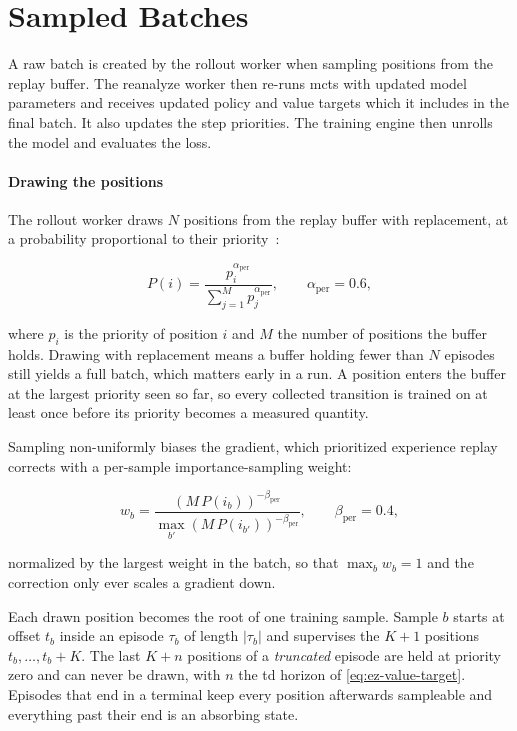 \section{Sampled Batches}\label{sec:app-loss-batch}

A raw batch is created by the rollout worker when sampling positions from the replay buffer.
The reanalyze worker then re-runs \gls{mcts} with updated model parameters and receives
updated policy and value targets which it includes in the final batch.
It also updates the step priorities.
The training engine then unrolls the model and evaluates the loss.

\paragraph{Drawing the positions}
The rollout worker draws $N$ positions from the replay buffer with replacement, at a probability
proportional to their priority~\cite{schaul_prioritized_2016}:

\begin{equation}\label{eq:app-loss-priority}
  P(i)=\frac{p_i^{\alpha_{\mathrm{per}}}}{\sum_{j=1}^{M} p_j^{\alpha_{\mathrm{per}}}},
  \qquad \alpha_{\mathrm{per}}=0.6,
\end{equation}

where $p_i$ is the priority of position $i$ and $M$ the number of positions the buffer holds.
Drawing with replacement means a buffer holding fewer than $N$ episodes still yields a full
batch, which matters early in a run.
A position enters the buffer at the largest priority seen so far, so every collected transition
is trained on at least once before its priority becomes a measured quantity.

Sampling non-uniformly biases the gradient, which prioritized experience replay corrects with a
per-sample importance-sampling weight:

\begin{equation}\label{eq:app-loss-is-weight}
  w_b=\frac{\left(M\,P(i_b)\right)^{-\beta_{\mathrm{per}}}}
           {\max_{b'}\left(M\,P(i_{b'})\right)^{-\beta_{\mathrm{per}}}},
  \qquad \beta_{\mathrm{per}}=0.4,
\end{equation}

normalized by the largest weight in the batch, so that $\max_b w_b=1$ and the correction only ever
scales a gradient down.

Each drawn position becomes the root of one training sample.
Sample $b$ starts at offset $t_b$ inside an episode $\tau_b$ of length $|\tau_b|$ and supervises
the $K+1$ positions $t_b,\dots,t_b+K$.
The last $K+n$ positions of a \emph{truncated} episode are held at priority zero and can never
be drawn, with $n$ the \gls{td} horizon of \cref{eq:ez-value-target}.
Episodes that end in a terminal keep every position afterwards sampleable and
everything past their end is an absorbing state.

